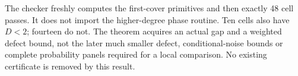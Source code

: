 The checker freshly computes the first-cover primitives and then exactly
48 cell passes. It does not import the higher-degree phase routine.
Ten cells also have $D<2$; fourteen do not. The theorem acquires an actual
gap and a weighted defect bound, not the later much smaller defect,
conditional-noise bounds or complete probability panels required for a
local comparison. No existing certificate is removed by this result.
